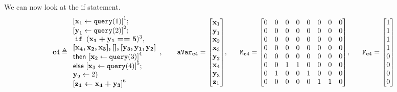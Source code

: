 \documentclass[a4paper,11pt]{article}
\begin{document}
%
We can now look at the if statement.
\[ 
%
 \ssa{c}4 \triangleq
\begin{array}{l}
   	\left[ \ssa{x}_1 \leftarrow \query(1) \right]^1; 
   	\\
   	\left[\ssa{y}_1 \leftarrow \query(2) \right]^2 ; 
   	\\
    \eif \;( \ssa{ x_1 + y_1 == 5} )^3,  \\
    \ssa{[ x_4,x_2,x_3 ],[] ,[y_3,y_1,y_2 ]} 
    \\
    \mathsf{then} ~ \left[ 
    \ssa{x}_2 \leftarrow \query(3) \right]^4 
    \\
    \mathsf{else} ~ \left[ 
    \ssa{x}_3 \leftarrow \query(4) \right]^5 ; 
    \\
    \ssa{y}_2 \leftarrow 2 ) \\
   \left[ \ssa{ z_1 \leftarrow x_4 +y_3 }\right]^6
\end{array},
~~~~~~
\avar_{\ssa{c}4} =  \left[ \begin{matrix}
\ssa{x}_1 \\
\ssa{y}_1 \\
\ssa{x}_2 \\
\ssa{x}_3 \\
\ssa{y}_2 \\
\ssa{x}_4 \\
\ssa{y}_3 \\
\ssa{z}_1 \\
\end{matrix} \right], 
~~~~~ 
\Mtrix_{\ssa{c}4} =  \left[ \begin{matrix}
 0 & 0 & 0 & 0 & 0 & 0 & 0 & 0 \\
 0 & 0 & 0 & 0 & 0 & 0 & 0 & 0 \\
 0 & 0 & 0 & 0 & 0 & 0 & 0 & 0 \\
 0 & 0 & 0 & 0 & 0 & 0 & 0 & 0 \\
 0 & 0 & 0 & 0 & 0 & 0 & 0 & 0 \\
 0 & 0 & 1 & 1 & 0 & 0 & 0 & 0 \\
 0 & 1 & 0 & 0 & 1 & 0 & 0 & 0 \\
 0 & 0 & 0 & 0 & 0 & 1 & 1 & 0 \\
\end{matrix} \right], 
~~~~~ 
\flag_{\ssa{c}4} = \left [ \begin{matrix}
 1 \\
 1 \\
 1 \\
 1 \\
 0 \\
 0 \\
 0 \\
 0 \\
\end{matrix} \right ]
\]
%
%
%
%
\end{document}
